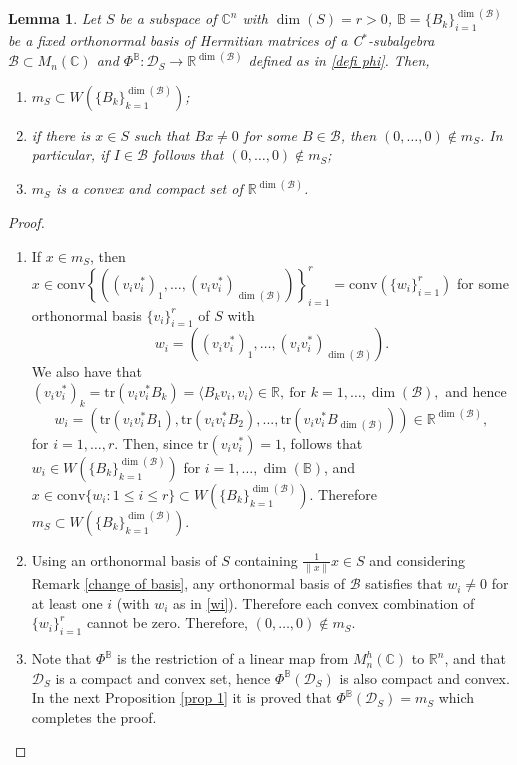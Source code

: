 \documentclass[12pt,a4paper]{article}
\def\calB{\mathcal B}
\def\calD{\mathcal D}
\def\R{\mathbb R}
\def\C{\mathbb C}
\def\tr{\text{tr}}
\newtheorem{lemma}{Lemma}
\numberwithin{equation}{section}
\begin{document}
 \begin{lemma} 
 \label{lema properties of ms}
 Let $S$ be a subspace of $\C^n$ with $\dim(S)=r>0$, $\mathbb{B}=\{B_k\}_{i=1}^{\dim(\calB)}$ be a fixed orthonormal basis of Hermitian matrices of a C$^*$-subalgebra $\calB\subset M_n(\C)$ and  $\Phi^{\mathbb{B}}:\calD_{S}\to\R^{\dim(\calB)}$ defined as in \eqref{defi phi}. Then,
  \begin{enumerate}
 	\item $m_S\subset W\left(\{B_k\}_{k=1}^{\dim(\calB)} \right) $;
 	\item if there is $x\in S$ such that $Bx\neq 0$ for some $B\in\calB$, then  $(0,\dots,0)\notin m_S$. In particular, if $I\in \calB$ follows that $(0,\dots,0)\notin m_S$;
 	\item \label{mS convexo compacto} $m_S$ is a convex and compact set of $\R^{\dim(\calB)}$.
 \end{enumerate}
\end{lemma}
\begin{proof}
	\begin{enumerate}  
	\item If $x\in m_S$, then $
	x\in \text{conv}\left\{ \left(\left(v_i v_i^*\right)_1,\dots, \left(v_i v_i^*\right)_{\dim(\calB)} \right)  \right\}_{i=1}^{r}=
	\text{conv}\left( \{w_i\}_{i=1}^r\right)
	$	
	for some orthonormal basis $\{v_i\}_{i=1}^r$ of $S$ with 
	$$w_i=\left(\left(v_i v_i^*\right)_1,\dots, \left(v_i v_i^*\right)_{\dim(\calB)} \right).$$ 
	We also have that 
	$
	\left(v_i v_i^*\right)_k=\tr(v_i v_i^* B_k)=\langle B_kv_i,v_i\rangle\in \R,\ \text{for } k=1,\dots,\dim(\mathcal{B}), 
	$
	and hence
	\begin{equation} \label{wi}
		w_i= \left( \tr(v_i v_i^* B_1),\tr(v_i v_i^* B_2),...,\tr(v_i v_i^* B_{\dim(\mathcal{B})})\right)\in \R^{\dim(\mathcal{B})},
	\end{equation}
	for  $i=1,\dots, r$. Then, since $\tr(v_i v_i^*)=1$, follows that $w_i\in  W\left(\{B_k\}_{k=1}^{\dim(\mathcal{B})} \right)$ for $i=1,\dots,\dim(\mathbb{B})$, 
	and $x\in \text{conv}\{w_i: 1\leq i\leq r\}\subset W\left(\{B_k\}_{k=1}^{\dim(\mathcal{B})} \right) $.
	Therefore $m_S\subset W\left(\{B_k\}_{k=1}^{\dim(\mathcal{B})} \right)$.
	
	\item Using an orthonormal basis of $S$ containing $\frac1{\|x\|}x\in S$ and considering Remark \ref{change of basis}, any orthonormal basis of $\calB$ satisfies that $w_i\neq 0$ for at least one $i$ (with $w_i$ as in \eqref{wi}). Therefore each convex combination of  $\{w_i\}_{i=1}^r$ cannot be zero. Therefore, $(0,\dots,0)\notin m_S$.
	
	\item Note that $\Phi^{\mathbb{B}}$ is the restriction of a linear map from $M_n^h(\C)$ to $\R^n$, and that $\calD_S$ is a compact and convex set, hence $\Phi^{\mathbb{B}}(\calD_S)$ is also compact and convex.   In the next Proposition \ref{prop 1} it is proved that $\Phi^{\mathbb{B}}(\calD_{S})=m_S$ which completes the proof.
\end{enumerate}
\end{proof}
\end{document}
